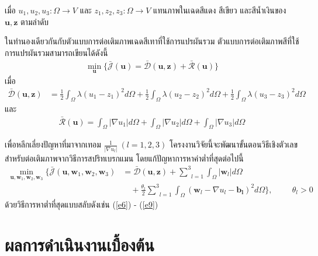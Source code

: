 \documentclass[hidelinks, a4paper,12pt]{article}
\numberwithin{equation}{section}							%
\numberwithin{equation}{section}
\begin{document}
{\noindent เมื่อ $u_1,u_2,u_3: \Omega  \rightarrow V$ และ $z_1,z_2,z_3: \Omega  \rightarrow V$ แทนภาพในเฉดสีแดง สีเขียว และสีน้ำเงินของ $\boldsymbol{u},\boldsymbol{z}$ ตามลำดับ 

\hspace{1cm} ในทำนองเดียวกันกับตัวแบบการต่อเติมภาพเฉดสีเทาที่ใช้การแปรผันรวม ตัวแบบการต่อเติมภาพสีที่ใช้การแปรผันรวมสามารถเขียนได้ดังนี้
\begin{align}
\min_{\boldsymbol{u}} \{ \bar{\mathcal{J}}(\boldsymbol{u})= \mathcal{\bar{D}}(\boldsymbol{u},\boldsymbol{z})+  \mathcal{\bar{R}}(\boldsymbol{u}) \}
\label{e10}
\end{align}
เมื่อ
\begin{align*}
\mathcal{\bar{D}}(\boldsymbol{u},\boldsymbol{z}) 
&= \frac{1}{2}\int_{\Omega}^{}\lambda(u_1 - z_1)^2 d\Omega + \frac{1}{2}\int_{\Omega}^{}\lambda(u_2 - z_2)^2 d\Omega + \frac{1}{2}\int_{\Omega}^{}\lambda(u_3 - z_3)^2 d\Omega
\end{align*}
และ 
\begin{align*}
\mathcal{\bar{R}}(\boldsymbol{u})= \int_{\Omega}^{}\lvert\nabla u_1 \rvert d\Omega + \int_{\Omega}^{}\lvert\nabla u_2 \rvert d\Omega + \int_{\Omega}^{}\lvert\nabla u_3 \rvert d\Omega
\end{align*}

\hspace{1cm} เพื่อหลีกเลี่ยงปัญหาที่มาจากเทอม $\tfrac{1}{|\nabla u_l|}\ (l=1,2,3)$ โครงงานวิจัยนี้จะพัฒนาขั้นตอนวิธีเชิงตัวเลขสำหรับต่อเติมภาพจากวิธีการสปริทเบรกแมน
โดยแก้ปัญหาการหาค่าต่ำที่สุดต่อไปนี้
\begin{align}
\min_{\boldsymbol{u},\boldsymbol{w}_1,\boldsymbol{w}_2,\boldsymbol{w}_3} \{\bar{\mathcal{J}}(\boldsymbol{u},\boldsymbol{w}_1,\boldsymbol{w}_2,\boldsymbol{w}_3)&= \mathcal{\bar{D}}(\boldsymbol{u},\boldsymbol{z}) +  \underset{l=1}{\overset{3}{\sum}} \int_{\Omega}^{}|\boldsymbol{w}_l|d\Omega
\nonumber\\
&\quad+ \frac{\theta_l}{2} \underset{l=1}{\overset{3}{\sum}}\int_{\Omega}^{}(\boldsymbol{w}_l - \nabla u_l - \boldsymbol{b_l})^{2}d\Omega\}, \hspace{1cm} \theta_l > 0
\end{align}
ด้วยวิธีการหาต่ำที่สุดแบบสลับดังเช่น (\ref{e6}) - (\ref{e9})

\section{ผลการดำเนินงานเบื้องต้น}
}
\end{document}

